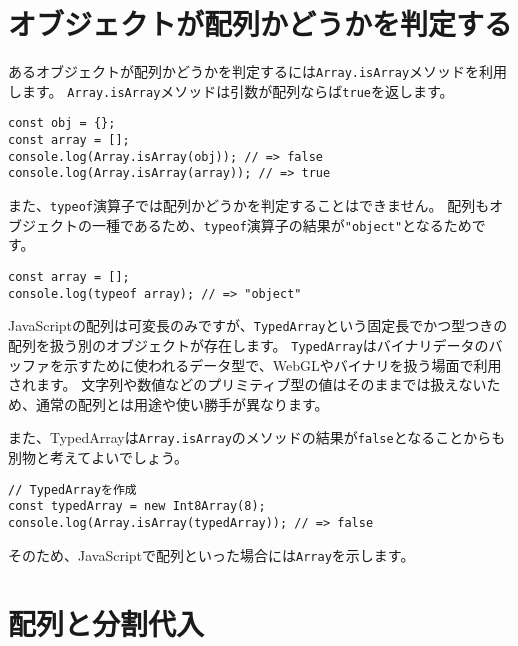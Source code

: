 \hypertarget{detect-array}{%
\section{オブジェクトが配列かどうかを判定する}\label{detect-array}}

あるオブジェクトが配列かどうかを判定するには\texttt{Array.isArray}メソッドを利用します。
\texttt{Array.isArray}メソッドは引数が配列ならば\texttt{true}を返します。

\begin{lstlisting}
const obj = {};
const array = [];
console.log(Array.isArray(obj)); // => false
console.log(Array.isArray(array)); // => true
\end{lstlisting}

また、\texttt{typeof}演算子では配列かどうかを判定することはできません。
配列もオブジェクトの一種であるため、\texttt{typeof}演算子の結果が\texttt{"object"}となるためです。

\begin{lstlisting}
const array = [];
console.log(typeof array); // => "object"
\end{lstlisting}

\begin{tcolorbox}[title=TypedArray\protect\icon{fig/es2015.eps}]\label{typed-array}

JavaScriptの配列は可変長のみですが、\texttt{TypedArray}という固定長でかつ型つきの配列を扱う別のオブジェクトが存在します。
\texttt{TypedArray}はバイナリデータのバッファを示すために使われるデータ型で、WebGLやバイナリを扱う場面で利用されます。
文字列や数値などのプリミティブ型の値はそのままでは扱えないため、通常の配列とは用途や使い勝手が異なります。

また、TypedArrayは\texttt{Array.isArray}のメソッドの結果が\texttt{false}となることからも別物と考えてよいでしょう。

\begin{lstlisting}
// TypedArrayを作成
const typedArray = new Int8Array(8);
console.log(Array.isArray(typedArray)); // => false
\end{lstlisting}

そのため、JavaScriptで配列といった場合には\texttt{Array}を示します。
\end{tcolorbox}

\hypertarget{array-destructuring}{%
\section[配列と分割代入]{配列と分割代入\protect{}}\label{array-destructuring}}

